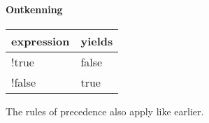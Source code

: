 \paragraph{Ontkenning}

\begin{center}
  \ttfamily
  \begin{tabular}{l@{\qquad}l}
    {\normalfont expression} & {\normalfont yields} \\
    \midrule
    !true   & false \\
    !false  & true \\
    \midrule
  \end{tabular}
\end{center}

The rules of precedence also apply like earlier.
